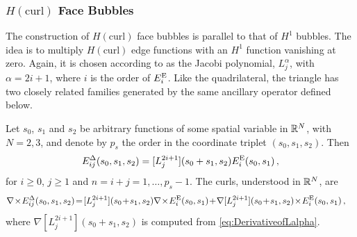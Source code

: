 \subsubsection{\texorpdfstring{$H(\mathrm{curl})$}{Hcurl} Face Bubbles}

The construction of $H(\mathrm{curl})$ face bubbles is parallel to that of $H^1$ bubbles. 
The idea is to multiply $H(\mathrm{curl})$ edge functions with an $H^1$ function vanishing at zero. 
Again, it is chosen according to \citet{Beuchler_Pillwein_Zaglmayr_13} as the Jacobi polynomial, $L_j^\alpha$, with $\alpha=2i+1$, where $i$ is the order of $E^{\mathrm{E}}_i$.
Like the quadrilateral, the triangle has two closely related families generated by the same ancillary operator defined below.

\begin{definition*}
Let $s_0$, $s_1$ and $s_2$ be arbitrary functions of some spatial variable in $\mathbb{R}^N$, with $N=2,3$, and denote by $p_s$ the order in the coordinate triplet $(s_0,s_1,s_2)$. Then
\begin{equation}
    E_{ij}^\Delta(s_0,s_1,s_2)=[L_j^{2i+1}](s_0+s_1,s_2)E_i^{\mathrm{E}}(s_0,s_1)\,,
\end{equation}
for $i\geq0$, $j\geq1$ and $n=i+j=1,\ldots,p_s-1$.
The curls, understood in $\mathbb{R}^N$, are
\begin{equation}
    \begin{aligned}
    \nabla\!\times\! E_{ij}^\Tri(s_0,s_1,s_2)&\!=\![L_j^{2i+1}](s_0\!+\!s_1,s_2)\nabla\!\times\! E_i^\E(s_0,s_1)
    	\!+\!\nabla[L_j^{2i+1}](s_0\!+\!s_1,s_2)\!\times\! E_i^\E(s_0,s_1)\,,
    \end{aligned}
\end{equation}
where $\nabla[L_j^{2i+1}](s_0+s_1,s_2)$ is computed from \eqref{eq:DerivativeofLalpha}.
\end{definition*}

